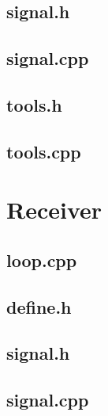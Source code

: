 \documentclass[12pt]{report}
\begin{document}


\subsection{signal.h}



\subsection{signal.cpp}



\subsection{tools.h}



\subsection{tools.cpp}



\section{Receiver}

\subsection{loop.cpp}



\subsection{define.h}



\subsection{signal.h}



\subsection{signal.cpp}
\end{document}
